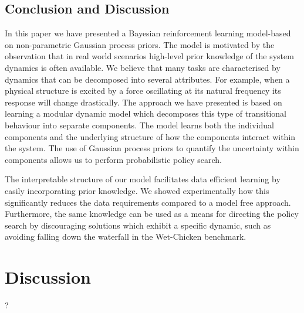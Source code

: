 \subsection{Conclusion and Discussion}
\label{sub:interpretable_reinforcement_learning:conclusion}
In this paper we have presented a Bayesian reinforcement learning model-based on non-parametric Gaussian process priors.
The model is motivated by the observation that in real world scenarios high-level prior knowledge of the system dynamics is often available.
We believe that many tasks are characterised by dynamics that can be decomposed into several attributes.
For example, when a physical structure is excited by a force oscillating at its natural frequency its response will change drastically.
The approach we have presented is based on learning a modular dynamic model which decomposes this type of transitional behaviour into separate components.
The model learns both the individual components and the underlying structure of how the components interact within the system.
The use of Gaussian process priors to quantify the uncertainty within components allows us to perform probabilistic policy search.

The interpretable structure of our model facilitates data efficient learning by easily incorporating prior knowledge.
We showed experimentally how this significantly reduces the data requirements compared to a model free approach.
Furthermore, the same knowledge can be used as a means for directing the policy search by discouraging solutions which exhibit a specific dynamic, such as avoiding falling down the waterfall in the Wet-Chicken benchmark.


\section{Discussion}
\label{sec:discussion}
?
